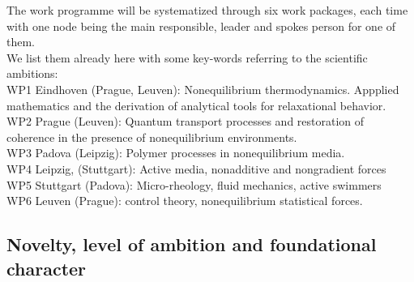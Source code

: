 The work programme will be systematized through six work packages, each time with one node being the main responsible, leader and spokes person for one of them.\\
We list them already here with some key-words referring to the scientific ambitions:\\
WP1 Eindhoven (Prague, Leuven): Nonequilibrium thermodynamics.  Appplied mathematics and the derivation of analytical tools for relaxational behavior.\\
WP2 Prague (Leuven): Quantum transport processes and restoration of coherence in the presence of nonequilibrium environments.\\
WP3 Padova (Leipzig): Polymer processes in nonequilibrium media.\\
WP4 Leipzig, (Stuttgart):  Active media, nonadditive and nongradient forces\\
WP5 Stuttgart (Padova): Micro-rheology, fluid mechanics, active swimmers\\
WP6 Leuven (Prague): control theory, nonequilibrium statistical forces.\\

\subsection{Novelty, level of ambition and foundational character}\label{sec:progress}


